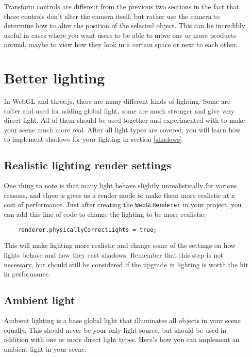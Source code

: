 \documentclass[10pt,final,journal,compsoc]{IEEEtran}
\begin{document}
        Transform controls are different from the previous two sections in the fact that these controls don't alter the camera itself, but rather use the camera to determine how to alter the position of the selected object. This can be incredibly useful in cases where you want users to be able to move one or more products around, maybe to view how they look in a certain space or next to each other.



\section{Better lighting} \label{better_lighting}
In WebGL and three.js, there are many different kinds of lighting. Some are softer and used for adding global light, some are much stronger and give very direct light. All of them should be used together and experimented with to make your scene much more real. After all light types are covered, you will learn how to implement shadows for your lighting in section \ref{shadows}.

    \subsection{Realistic lighting render settings}
    One thing to note is that many light behave slightly unrealistically for various reasons, and three.js gives us a render mode to make them more realistic at a cost of performance. Just after creating the \verb|WebGLRenderer| in your project, you can add this line of code to change the lighting to be more realistic:

    \begin{lstlisting}
    renderer.physicallyCorrectLights = true;
    \end{lstlisting}

    This will make lighting more realistic and change some of the settings on how lights behave and how they cast shadows. Remember that this step is not necessary, but should still be considered if the upgrade in lighting is worth the hit in performance.

    \subsection{Ambient light}
    Ambient lighting is a base global light that illuminates all objects in your scene equally. This should never be your only light source, but should be used in addition with one or more direct light types. Here's how you can implement an ambient light in your scene:
    
\end{document}
